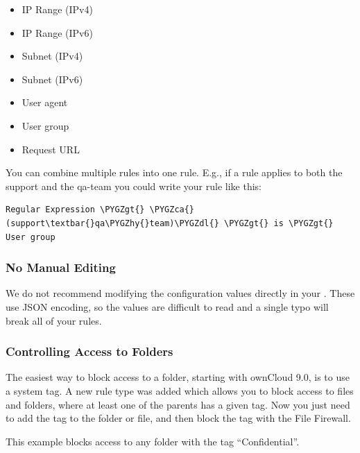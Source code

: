 \documentclass[letterpaper,10pt,english]{sphinxmanual}
\def\PYGZca{\char`\^}
\def\PYGZgt{\char`\>}
\def\PYGZdl{\char`\$}
\def\PYGZhy{\char`\-}
\begin{document}
\begin{itemize}
\item {} 
IP Range (IPv4)

\item {} 
IP Range (IPv6)

\item {} 
Subnet (IPv4)

\item {} 
Subnet (IPv6)

\item {} 
User agent

\item {} 
User group

\item {} 
Request URL

\end{itemize}

You can combine multiple rules into one rule. E.g., if a rule applies to both
the support and the qa-team you could write your rule like this:

\begin{Verbatim}[commandchars=\\\{\}]
Regular Expression \PYGZgt{} \PYGZca{}(support\textbar{}qa\PYGZhy{}team)\PYGZdl{} \PYGZgt{} is \PYGZgt{} User group
\end{Verbatim}


\subsubsection{No Manual Editing}
\label{enterprise_firewall/file_firewall:no-manual-editing}
We do not recommend modifying the configuration values directly in your
. These use JSON encoding, so the values are difficult to read
and a single typo will break all of your rules.


\subsubsection{Controlling Access to Folders}
\label{enterprise_firewall/file_firewall:controlling-access-to-folders}
The easiest way to block access to a folder, starting with ownCloud 9.0, is to use a
system tag. A new rule type was added which allows you to block access to
files and folders, where at least one of the parents has a given tag. Now you
just need to add the tag to the folder or file, and then block the tag with the
File Firewall.

This example blocks access to any folder with the tag ``Confidential''.
\end{document}
